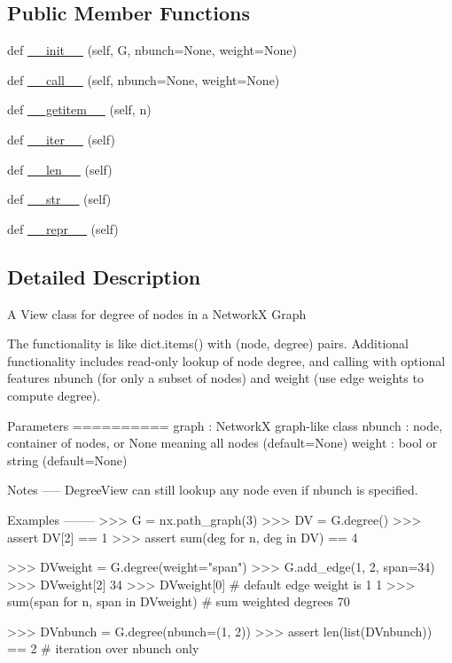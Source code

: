 \subsection*{Public Member Functions}
\begin{DoxyCompactItemize}
\item 
def \hyperlink{classnetworkx_1_1classes_1_1reportviews_1_1DiDegreeView_aa1666834e578c623e7cb56ad27c57915}{\+\_\+\+\_\+init\+\_\+\+\_\+} (self, G, nbunch=None, weight=None)
\item 
def \hyperlink{classnetworkx_1_1classes_1_1reportviews_1_1DiDegreeView_a8d44851c4d18f45ebabc43614c0c6b82}{\+\_\+\+\_\+call\+\_\+\+\_\+} (self, nbunch=None, weight=None)
\item 
def \hyperlink{classnetworkx_1_1classes_1_1reportviews_1_1DiDegreeView_afacbe652338047fbc17faecff53ecff0}{\+\_\+\+\_\+getitem\+\_\+\+\_\+} (self, n)
\item 
def \hyperlink{classnetworkx_1_1classes_1_1reportviews_1_1DiDegreeView_ad3e4a225b4ad993a385a8d1cf4119bd7}{\+\_\+\+\_\+iter\+\_\+\+\_\+} (self)
\item 
def \hyperlink{classnetworkx_1_1classes_1_1reportviews_1_1DiDegreeView_ae9c0c335e025a0d7259e2db673d5b3e5}{\+\_\+\+\_\+len\+\_\+\+\_\+} (self)
\item 
def \hyperlink{classnetworkx_1_1classes_1_1reportviews_1_1DiDegreeView_a723ba58cc2d913af17fb2408bb390f05}{\+\_\+\+\_\+str\+\_\+\+\_\+} (self)
\item 
def \hyperlink{classnetworkx_1_1classes_1_1reportviews_1_1DiDegreeView_a96ca885bfe0ad463afd6e5b30df46e34}{\+\_\+\+\_\+repr\+\_\+\+\_\+} (self)
\end{DoxyCompactItemize}


\subsection{Detailed Description}
\begin{DoxyVerb}A View class for degree of nodes in a NetworkX Graph

The functionality is like dict.items() with (node, degree) pairs.
Additional functionality includes read-only lookup of node degree,
and calling with optional features nbunch (for only a subset of nodes)
and weight (use edge weights to compute degree).

Parameters
==========
graph : NetworkX graph-like class
nbunch : node, container of nodes, or None meaning all nodes (default=None)
weight : bool or string (default=None)

Notes
-----
DegreeView can still lookup any node even if nbunch is specified.

Examples
--------
>>> G = nx.path_graph(3)
>>> DV = G.degree()
>>> assert DV[2] == 1
>>> assert sum(deg for n, deg in DV) == 4

>>> DVweight = G.degree(weight="span")
>>> G.add_edge(1, 2, span=34)
>>> DVweight[2]
34
>>> DVweight[0]  #  default edge weight is 1
1
>>> sum(span for n, span in DVweight)  # sum weighted degrees
70

>>> DVnbunch = G.degree(nbunch=(1, 2))
>>> assert len(list(DVnbunch)) == 2  # iteration over nbunch only
\end{DoxyVerb}
 

